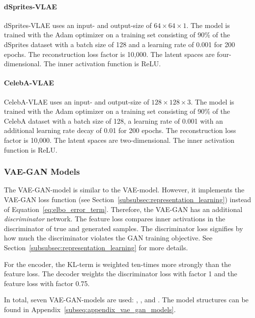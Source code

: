 \paragraph{dSprites-\ac{VLAE}} dSprites-\ac{VLAE} uses an input- and output-size of $64\times 64\times 1$.
The model is trained with the Adam optimizer on a training set consisting of 90\% of the dSprites dataset with a batch size of 128 and a learning rate of 0.001 for 200 epochs.
The reconstruction loss factor is 10,000.
The latent spaces are four-dimensional.
The inner activation function is ReLU.

\paragraph{CelebA-\ac{VLAE}} CelebA-\ac{VLAE} uses an input- and output-size of $128\times 128\times 3$.
The model is trained with the Adam optimizer on a training set consisting of 90\% of the CelebA dataset with a batch size of 128, a learning rate of 0.001 with an additional learning rate decay of 0.01 for 200 epochs.
The reconstruction loss factor is 10,000.
The latent spaces are two-dimensional.
The inner activation function is ReLU.

\subsubsection{VAE-GAN Models}\label{subsubsec:vae_gan_models}

The \ac{VAE}-\ac{GAN}-model is similar to the \ac{VAE}-model.
However, it implements the \ac{VAE}-\ac{GAN} loss function (see Section~\ref{subsubsec:representation_learning}) instead of Equation~\ref{eq:elbo_error_term}.
Therefore, the \ac{VAE}-\ac{GAN} has an additional \textit{discriminator} network.
The feature loss compares inner activations in the discriminator of true and generated samples.
The discriminator loss signifies by how much the discriminator violates the \ac{GAN} training objective.
See Section~\ref{subsubsec:representation_learning} for more details.

For the encoder, the \ac{KL}-term is weighted ten-times more strongly than the feature loss.
The decoder weights the discriminator loss with factor 1 and the feature loss with factor 0.75.

In total, seven \ac{VAE}-\ac{GAN}-models are used: , , and .
The model structures can be found in Appendix~\ref{subseq:appendix_vae_gan_models}.

